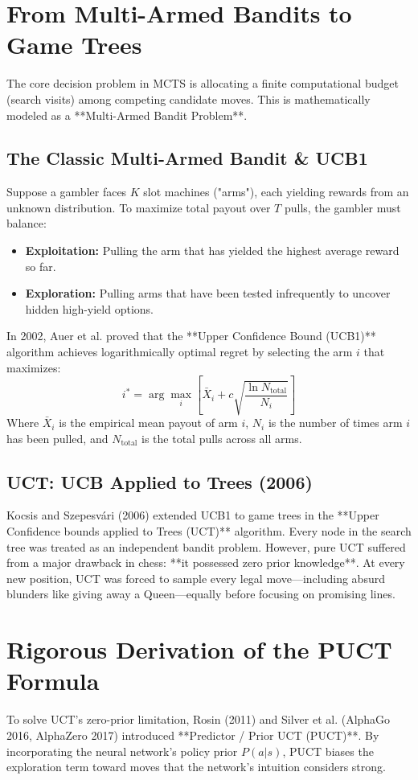 \documentclass[11pt,a4paper]{report}
\begin{document}
\section{From Multi-Armed Bandits to Game Trees}
The core decision problem in MCTS is allocating a finite computational budget (search visits) among competing candidate moves. This is mathematically modeled as a **Multi-Armed Bandit Problem**.

\subsection{The Classic Multi-Armed Bandit \& UCB1}
Suppose a gambler faces $K$ slot machines ("arms"), each yielding rewards from an unknown distribution. To maximize total payout over $T$ pulls, the gambler must balance:
\begin{itemize}
    \item \textbf{Exploitation:} Pulling the arm that has yielded the highest average reward so far.
    \item \textbf{Exploration:} Pulling arms that have been tested infrequently to uncover hidden high-yield options.
\end{itemize}
In 2002, Auer et al. proved that the **Upper Confidence Bound (UCB1)** algorithm achieves logarithmically optimal regret by selecting the arm $i$ that maximizes:
\begin{equation}
i^* = \arg\max_{i} \left[ \bar{X}_i + c \sqrt{\frac{\ln N_{\text{total}}}{N_i}} \right]
\end{equation}
Where $\bar{X}_i$ is the empirical mean payout of arm $i$, $N_i$ is the number of times arm $i$ has been pulled, and $N_{\text{total}}$ is the total pulls across all arms.

\subsection{UCT: UCB Applied to Trees (2006)}
Kocsis and Szepesvári (2006) extended UCB1 to game trees in the **Upper Confidence bounds applied to Trees (UCT)** algorithm. Every node in the search tree was treated as an independent bandit problem. However, pure UCT suffered from a major drawback in chess: **it possessed zero prior knowledge**. At every new position, UCT was forced to sample every legal move---including absurd blunders like giving away a Queen---equally before focusing on promising lines.

\section{Rigorous Derivation of the PUCT Formula}
To solve UCT's zero-prior limitation, Rosin (2011) and Silver et al. (AlphaGo 2016, AlphaZero 2017) introduced **Predictor / Prior UCT (PUCT)**. By incorporating the neural network's policy prior $P(a|s)$, PUCT biases the exploration term toward moves that the network's intuition considers strong.
\end{document}
